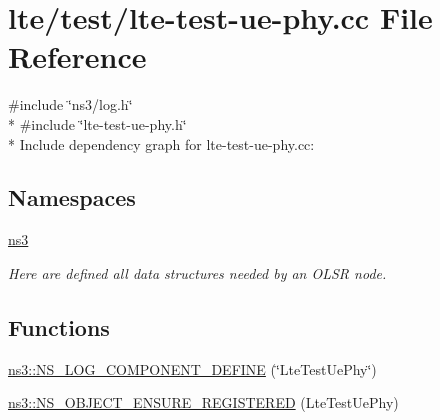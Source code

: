 \hypertarget{lte-test-ue-phy_8cc}{}\section{lte/test/lte-\/test-\/ue-\/phy.cc File Reference}
\label{lte-test-ue-phy_8cc}
{\ttfamily \#include \char`\"{}ns3/log.\+h\char`\"{}}\\*
{\ttfamily \#include \char`\"{}lte-\/test-\/ue-\/phy.\+h\char`\"{}}\\*
Include dependency graph for lte-\/test-\/ue-\/phy.cc\+:
\subsection*{Namespaces}
\begin{DoxyCompactItemize}
\item 
 \hyperlink{namespacens3}{ns3}
\begin{DoxyCompactList}\small\item\em Here are defined all data structures needed by an O\+L\+SR node. \end{DoxyCompactList}\end{DoxyCompactItemize}
\subsection*{Functions}
\begin{DoxyCompactItemize}
\item 
\hyperlink{namespacens3_a25f36741eeee424c32e56d7df36788fe}{ns3\+::\+N\+S\+\_\+\+L\+O\+G\+\_\+\+C\+O\+M\+P\+O\+N\+E\+N\+T\+\_\+\+D\+E\+F\+I\+NE} (\char`\"{}Lte\+Test\+Ue\+Phy\char`\"{})
\item 
\hyperlink{namespacens3_ad30415fd9195466784a8954eec1e3327}{ns3\+::\+N\+S\+\_\+\+O\+B\+J\+E\+C\+T\+\_\+\+E\+N\+S\+U\+R\+E\+\_\+\+R\+E\+G\+I\+S\+T\+E\+R\+ED} (Lte\+Test\+Ue\+Phy)
\end{DoxyCompactItemize}
